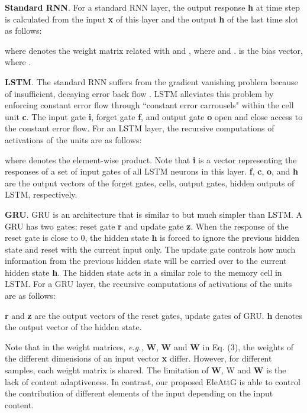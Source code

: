 \documentclass[journal]{IEEEtran}
\begin{document}
\textbf{Standard RNN}. For a standard RNN layer, the output response \textbf{{h}} at time step  is calculated from the input \textbf{{x}} of this layer and the output \textbf{{h}} of the last time slot as follows:

where  denotes the weight matrix related with  and , where    and   .  is the bias vector, where   . 

\textbf{LSTM}. The standard RNN suffers from the gradient vanishing problem because of insufficient, decaying error back flow \cite{hochreiter1997long}. LSTM alleviates this problem by enforcing constant error flow through ``constant error carrousels" within the cell unit \textbf{{c}}. The input gate \textbf{{i}}, forget gate \textbf{{f}}, and output gate \textbf{{o}} open and close access to the constant error flow. For an LSTM layer, the recursive computations of activations of the units are as follows:

where  denotes the element-wise product. Note that \textbf{{i}} is a vector representing the responses of a set of input gates of all LSTM neurons in this layer. \textbf{f}, \textbf{c}, \textbf{o}, and \textbf{h} are the output vectors of the forget gates, cells, output gates, hidden outputs of LSTM, respectively.

\textbf{GRU}. GRU is an architecture that is similar to but much simpler than LSTM. A GRU has two gates: reset gate \textbf{r} and update gate \textbf{z}. When the response of the reset gate is close to 0, the hidden state \textbf{h} is forced to ignore the previous hidden state and reset with the current input only. The update gate controls how much information from the previous hidden state will be carried over to the current hidden state \textbf{h}. The hidden state acts in a similar role to the memory cell in LSTM. For a GRU layer, the recursive computations of activations of the units are as follows:

\textbf{r} and \textbf{z} are the output vectors of the reset gates, update gates of GRU. \textbf{h} denotes the output vector of the hidden state.

Note that in the weight matrices, {\it{e.g.},} \textbf{W}, \textbf{W} and\textbf{ W} in Eq. (3),  the weights of the different dimensions of an input vector\textbf{ x} differ. However, for different samples, each weight matrix is shared.  The limitation of \textbf{W}, W and \textbf{W} is the lack of content adaptiveness. In contrast, our proposed EleAttG is able to control the contribution of different elements of the input depending on the input content.
\end{document}
